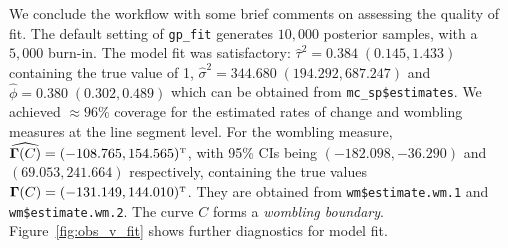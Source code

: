 We conclude the workflow with some brief comments on assessing the quality of fit. The default setting of \texttt{gp\_fit} generates $10,000$ posterior samples, with a $5,000$ burn-in. The model fit was satisfactory: $\widehat{\tau}^2 = 0.384\;(0.145,1.433)$ containing the true value of 1, $\widehat{\sigma}^2 = 344.680\;(194.292, 687.247)$ and $\widehat{\phi}=0.380\;(0.302, 0.489)$ which can be obtained from \texttt{mc\_sp\$estimates}. We achieved $\approx96\%$ coverage for the estimated rates of change and wombling measures at the line segment level. For the wombling measure, $\widehat{\bGamma(C)}=(-108.765, 154.565)^{\T}$, with 95\% CIs being $(-182.098, -36.290)$ and $(69.053, 241.664)$ respectively, containing the true values $\bGamma(C)=(-131.149, 144.010)^{\T}$. They are obtained from \texttt{wm\$estimate.wm.1} and \texttt{wm\$estimate.wm.2}. The curve $C$ forms a \emph{wombling boundary}. Figure~\ref{fig:obs_v_fit} shows further diagnostics for model fit. 


